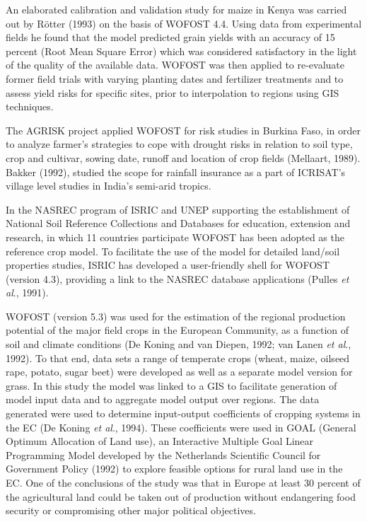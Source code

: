 \documentclass[11pt]{article}
\begin{document}
\bigskip
An elaborated calibration and validation study for maize in Kenya was carried out by
R\"{o}tter (1993) on the basis of WOFOST 4.4. Using data from experimental fields he
found that the model predicted grain yields with an accuracy of 15 percent (Root Mean
Square Error) which was considered satisfactory in the light of the quality of the available
data. WOFOST was then applied to re-evaluate former field trials with varying planting
dates and fertilizer treatments and to assess yield risks for specific sites, prior to
interpolation to regions using GIS techniques.

\bigskip
The AGRISK project applied WOFOST for risk studies in Burkina Faso, in order to
analyze farmer's strategies to cope with drought risks in relation to soil type, crop and
cultivar, sowing date, runoff and location of crop fields (Mellaart, 1989). Bakker (1992),
studied the scope for rainfall insurance as a part of ICRISAT's village level studies in
India's semi-arid tropics.

\bigskip
In the NASREC program of ISRIC and UNEP supporting the estab\-lishment of National
Soil Reference Collections and Databases for education, extension and research, in which
11 countries participate WOFOST has been adopted as the reference crop model. To
facilitate the use of the model for detailed {\nobreak}land/soil properties studies, ISRIC has
developed a user-friendly shell for WOFOST (version 4.3), providing a link to the
NASREC database applications (Pulles {\it et al\/}., 1991).

\bigskip
WOFOST (version 5.3) was used for the estimation of the {\nobreak}regional production potential of
the major field crops in the European Community, as a function of soil and climate condi\-tions (De Koning and van Diepen, 1992; van Lanen {\it et al\/}., 1992). To that end, data sets a
range of temperate crops (wheat, maize, oilseed rape, potato, sugar beet) were devel\-oped
as well as a separate model version for grass. In this study the model was linked to a GIS
to facilitate generation of model input data and to aggregate model output over regions.
The data generated were used to determine input-output coefficients of cropping systems
in the EC (De Koning {\it et al\/}., 1994). These coefficients were used in GOAL (General
Optimum Allocation of Land use), an Interactive Multiple Goal Linear Program\-ming
Model developed by the Netherlands Scien\-tific Council for Government Policy (1992) to
explore feasible options for rural land use in the EC. One of the conclusions of the study
was that in Europe at least 30 percent of the agricultural land could be taken out of
production without endangering food security or compromising other major politi\-cal
objectives.
\end{document}
